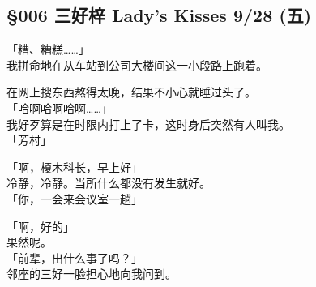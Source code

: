 \subsection{§006 三好梓 Lady's Kisses 9/28 (五)}

「糟、糟糕……」\\

我拼命地在从车站到公司大楼间这一小段路上跑着。

在网上搜东西熬得太晚，结果不小心就睡过头了。\\

「哈啊哈啊哈啊……」\\

我好歹算是在时限内打上了卡，这时身后突然有人叫我。\\

「芳村」

「啊，榎木科长，早上好」\\

冷静，冷静。当所什么都没有发生就好。\\

「你，一会来会议室一趟」

「啊，好的」\\

果然呢。\\

「前辈，出什么事了吗？」\\

邻座的三好一脸担心地向我问到。

